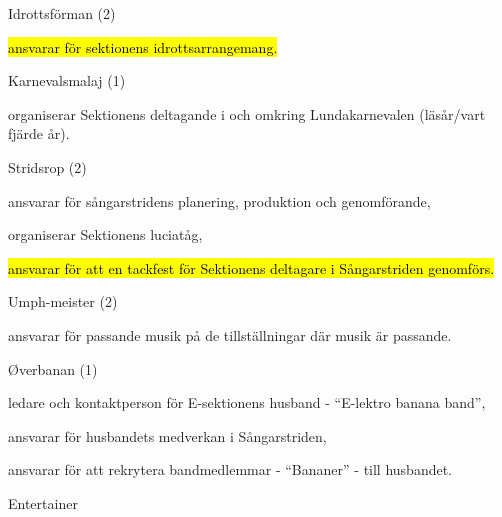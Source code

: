 \documentclass[../_main/handlingar.tex]{subfiles}
\begin{document}
\begin{attsatser}
        Idrottsförman (2)
          \begin{tightdashlist}
              \item \hl{ansvarar för sektionens idrottsarrangemang.}
          \end{tightdashlist}

        Karnevalsmalaj (1)
          \begin{tightdashlist}
              \item organiserar Sektionens deltagande i och omkring Lundakarnevalen (läsår/vart fjärde år).
          \end{tightdashlist}

        Stridsrop (2)
          \begin{tightdashlist}
              \item ansvarar för sångarstridens planering, produktion och genomförande,
              \item organiserar Sektionens luciatåg,
              \item \hl{ansvarar för att en tackfest för Sektionens deltagare i Sångarstriden genomförs.}
          \end{tightdashlist}

        Umph-meister (2)
        \begin{tightdashlist}
            \item ansvarar för passande musik på de tillställningar där musik är passande.
        \end{tightdashlist}

        Øverbanan (1)
        \begin{tightdashlist}
            \item ledare och kontaktperson för E-sektionens husband - “E-lektro banana band”,
            \item ansvarar för husbandets medverkan i Sångarstriden,
            \item ansvarar för att rekrytera bandmedlemmar - “Bananer” - till husbandet.
        \end{tightdashlist}

\end{attsatser}
\begin{signatures}{1}
    \ist
    \signature{Albin Nyström Eklund}{Entertainer}
\end{signatures}
\end{document}
